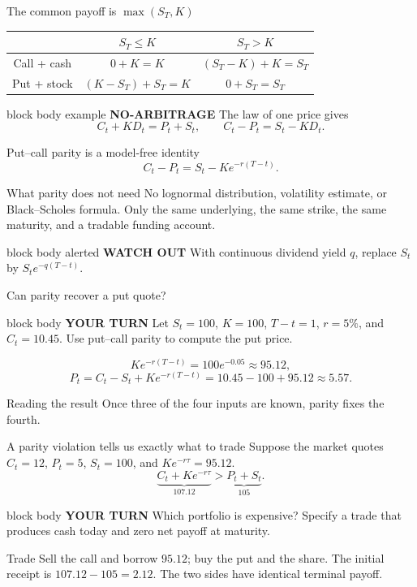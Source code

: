 \documentclass[handout,10pt,aspectratio=169]{beamer}
\newenvironment{marketbox}{\begin{beamercolorbox}[rounded=true,sep=0.7em,wd=\textwidth]{block body example}
  \textbf{\color{CourseGreen}NO-ARBITRAGE}\quad}{\end{beamercolorbox}}
\newenvironment{simplificationbox}{\begin{beamercolorbox}[rounded=true,sep=0.7em,wd=\textwidth]{block body alerted}
  \textbf{\color{CourseRed}WATCH OUT}\quad}{\end{beamercolorbox}}
\newenvironment{pausebox}{\begin{beamercolorbox}[rounded=true,sep=0.8em,wd=\textwidth]{block body}
  \textbf{\color{CourseGold}YOUR TURN}\quad}{\end{beamercolorbox}}
\newcommand{\1}{\mathbf 1}
\begin{document}
\begin{frame}{The common payoff is \(\max(S_T,K)\)}
\begin{center}
\begin{tabular}{c|cc}
\toprule
 & \(S_T\le K\) & \(S_T>K\)\\
\midrule
Call + cash & \(0+K=K\) & \((S_T-K)+K=S_T\)\\
Put + stock & \((K-S_T)+S_T=K\) & \(0+S_T=S_T\)\\
\bottomrule
\end{tabular}
\end{center}
\begin{marketbox}
The law of one price gives
\[
\boxed{C_t+K D_t=P_t+S_t,\qquad C_t-P_t=S_t-KD_t.}
\]
\end{marketbox}
\end{frame}

\begin{frame}{Put--call parity is a model-free identity}
\[
\boxed{C_t-P_t=S_t-Ke^{-r(T-t)}.}
\]
\begin{block}{What parity does not need}
No lognormal distribution, volatility estimate, or Black--Scholes formula.
Only the same underlying, the same strike, the same maturity, and a tradable
funding account.
\end{block}
\begin{simplificationbox}
With continuous dividend yield \(q\), replace \(S_t\) by
\(S_te^{-q(T-t)}\).
\end{simplificationbox}
\end{frame}

\begin{frame}{Can parity recover a put quote?}
\begin{pausebox}
Let \(S_t=100\), \(K=100\), \(T-t=1\), \(r=5\%\), and \(C_t=10.45\).
Use put--call parity to compute the put price.
\end{pausebox}

\[
K e^{-r(T-t)}=100e^{-0.05}\approx95.12,
\]
\[
P_t=C_t-S_t+K e^{-r(T-t)}
=10.45-100+95.12
\boxed{\approx5.57.}
\]
\begin{block}{Reading the result}
Once three of the four inputs are known, parity fixes the fourth.
\end{block}
\end{frame}

\begin{frame}{A parity violation tells us exactly what to trade}
Suppose the market quotes \(C_t=12\), \(P_t=5\), \(S_t=100\), and
\(K e^{-r\tau}=95.12\).
\[
\underbrace{C_t+K e^{-r\tau}}_{107.12}
>
\underbrace{P_t+S_t}_{105}.
\]
\begin{pausebox}
Which portfolio is expensive? Specify a trade that produces cash today and
zero net payoff at maturity.
\end{pausebox}

\begin{exampleblock}{Trade}
Sell the call and borrow \(95.12\); buy the put and the share. The initial
receipt is \(107.12-105=2.12\). The two sides have identical terminal payoff.
\end{exampleblock}
\end{frame}
\end{document}
